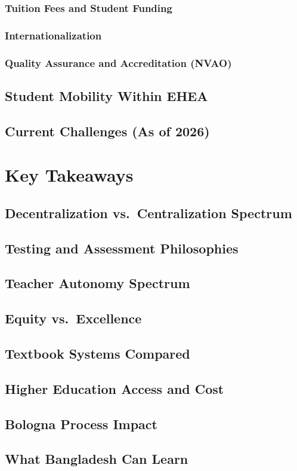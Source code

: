 \subsection{Tuition Fees and Student Funding}
\subsection{Internationalization}
\subsection{Quality Assurance and Accreditation (NVAO)}

\section{Student Mobility Within EHEA}
\section{Current Challenges (As of 2026)}


\chapter{Key Takeaways}

\section{Decentralization vs.\ Centralization Spectrum}
\section{Testing and Assessment Philosophies}
\section{Teacher Autonomy Spectrum}
\section{Equity vs.\ Excellence}
\section{Textbook Systems Compared}
\section{Higher Education Access and Cost}
\section{Bologna Process Impact}
\section{What Bangladesh Can Learn}
